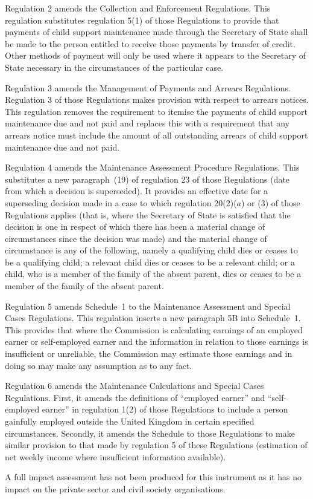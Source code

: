 \documentclass[12pt,a4paper]{article}
\begin{document}
Regulation 2 amends the Collection and Enforcement Regulations. This regulation substitutes regulation 5(1) of those Regulations to provide that payments of child support maintenance made through the Secretary of State shall be made to the person entitled to receive those payments by transfer of credit. Other methods of payment will only be used where it appears to the Secretary of State necessary in the circumstances of the particular case.

Regulation 3 amends the Management of Payments and Arrears Regulations. Regulation 3 of those Regulations makes provision with respect to arrears notices. This regulation removes the requirement to itemise the payments of child support maintenance due and not paid and replaces this with a requirement that any arrears notice must include the amount of all outstanding arrears of child support maintenance due and not paid.

Regulation 4 amends the Maintenance Assessment Procedure Regulations. This substitutes a new paragraph~(19) of regulation 23 of those Regulations (date from which a decision is superseded). It provides an effective date for a superseding decision made in a case to which regulation 20(2)($a$)  or (3) of those Regulations applies (that is, where the Secretary of State is satisfied that the decision is one in respect of which there has been a material change of circumstances since the decision was made) and the material change of circumstance is any of the following, namely a qualifying child dies or ceases to be a qualifying child; a relevant child dies or ceases to be a relevant child; or a child, who is a member of the family of the absent parent, dies or ceases to be a member of the family of the absent parent.

Regulation 5 amends Schedule~1 to the Maintenance Assessment and Special Cases Regulations. This regulation inserts a new paragraph 5B into Schedule~1. This provides that where the Commission is calculating earnings of an employed earner or self-employed earner and the information in relation to those earnings is insufficient or unreliable, the Commission may estimate those earnings and in doing so may make any assumption as to any fact.

Regulation 6 amends the Maintenance Calculations and Special Cases Regulations. First, it amends the definitions of “employed earner” and “self-employed earner” in regulation 1(2) of those Regulations to include a person gainfully employed outside the United Kingdom in certain specified circumstances. Secondly, it amends the Schedule to those Regulations to make similar provision to that made by regulation 5 of these Regulations (estimation of net weekly income where insufficient information available).

A full impact assessment has not been produced for this instrument as it has no impact on the private sector and civil society organisations. 
\end{document}
